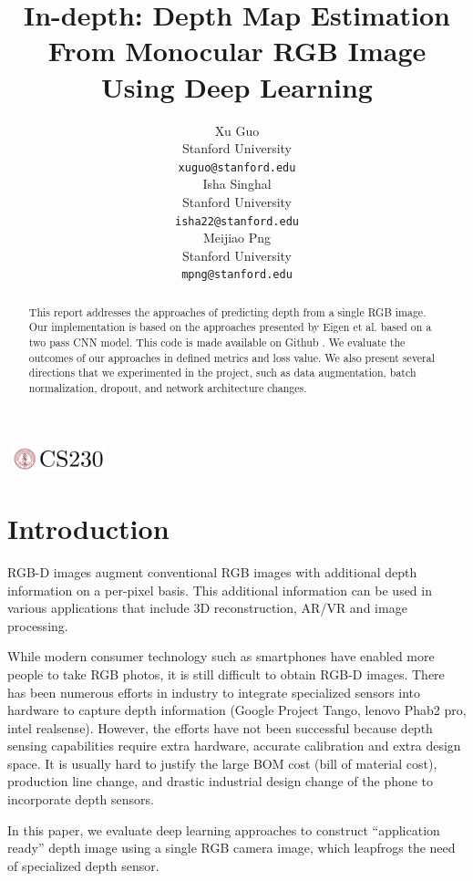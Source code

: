 \documentclass{article}
\title{In-depth: Depth Map Estimation From Monocular RGB Image Using Deep Learning}
\author{
  Xu Guo\\
  Stanford University\\
  \texttt{xuguo@stanford.edu}\\
  \And
  Isha Singhal\\
  Stanford University\\
  \texttt{isha22@stanford.edu}\\
  \And
  Meijiao Png\\
  Stanford University\\
  \texttt{mpng@stanford.edu}\\
}
\begin{document}
    \begin{center}
    \includegraphics[width=3cm, height=0.7cm]{CS230}
    \end{center}

    \maketitle

\begin{abstract}
    This report addresses the approaches of predicting depth from a single RGB image. Our implementation is based on the approaches presented by Eigen et al. \cite{nips-1} based on a two pass CNN model.  This code is made available on Github \cite{github-repo}. We evaluate the outcomes of our approaches in defined metrics and loss value. We also present several directions that we experimented in the project, such as data augmentation, batch normalization, dropout, and network architecture changes.
\end{abstract}

\section{Introduction}	
    RGB-D images augment conventional RGB images with additional depth information on a per-pixel basis. This additional information can be used in various applications that include 3D reconstruction, AR/VR and image processing.  

    While modern consumer technology such as smartphones have enabled more people to take RGB photos, it is still difficult to obtain RGB-D images. There has been numerous efforts in industry to integrate specialized sensors into hardware to capture depth information (Google Project Tango, lenovo Phab2 pro, intel realsense). However, the efforts have not been successful because depth sensing capabilities require extra hardware, accurate calibration and extra design space. It is usually hard to justify the large BOM cost (bill of material cost), production line change, and drastic industrial design change of the phone to incorporate depth sensors.
    
    In this paper, we evaluate deep learning approaches to construct “application ready” depth image using a single RGB camera image, which leapfrogs the need of specialized depth sensor.
    
\end{document}
